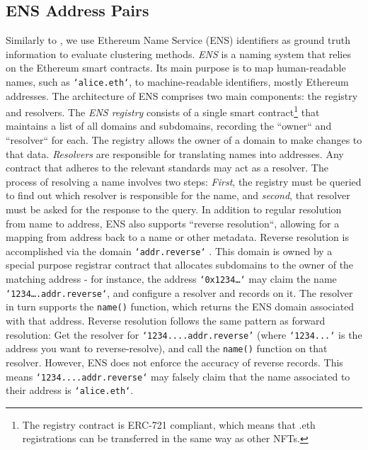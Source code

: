 \documentclass[12pt,a4paper,titlepage,oneside,english]{article}
\begin{document}
\subsection{ENS Address Pairs}
\label{sec:ens}
Similarly to \cite{Beres2020}, we use Ethereum Name Service (ENS) identifiers as ground truth information to evaluate clustering methods.\newline
\textit{ENS} is a naming system that relies on the Ethereum smart contracts. Its main purpose is to map human-readable names, such as \texttt{`alice.eth`}, to machine-readable identifiers, mostly Ethereum addresses. The architecture of ENS comprises two main components: the registry and resolvers. \newline
The \textit{ENS registry} consists of a single smart contract\footnote{The registry contract is ERC-721 compliant, which means that .eth registrations can be transferred in the same way as other NFTs.} that maintains a list of all domains and subdomains, recording the ``owner`` and ``resolver`` for each. The registry allows the owner of a domain to make changes to that data. 
\textit{Resolvers} are responsible for translating names into addresses. Any contract that adheres to the relevant standards may act as a resolver. The process of resolving a name involves two steps: \textit{First}, the registry must be queried to find out which resolver is responsible for the name, and \textit{second}, that resolver must be asked for the response to the query. \citep{ENSdocs} \newline
In addition to regular resolution from name to address, ENS also supports ``reverse resolution``, allowing for a mapping from address back to a name or other metadata. Reverse resolution is accomplished via the %
 domain \texttt{`addr.reverse`}%
. This domain is owned by a special purpose registrar contract that allocates subdomains to the owner of the matching address - for instance, the address \texttt{`0x1234\dots`} may claim the name \texttt{`1234\dots.addr.reverse`}, and configure a resolver and records on it. The resolver in turn supports the \texttt{name()} function, which returns the ENS domain associated with that address.\newline
 Reverse resolution %
 follows the same pattern as forward resolution: Get the resolver for \texttt{`1234....addr.reverse'} (where \texttt{`1234...`} is the address you want to reverse-resolve), and call the \texttt{name()} function on that resolver. However, ENS does not enforce the accuracy of reverse records. This means \texttt{`1234....addr.reverse`} may falsely claim that the name associated to their address is \texttt{`alice.eth`}. 
 
\end{document}
